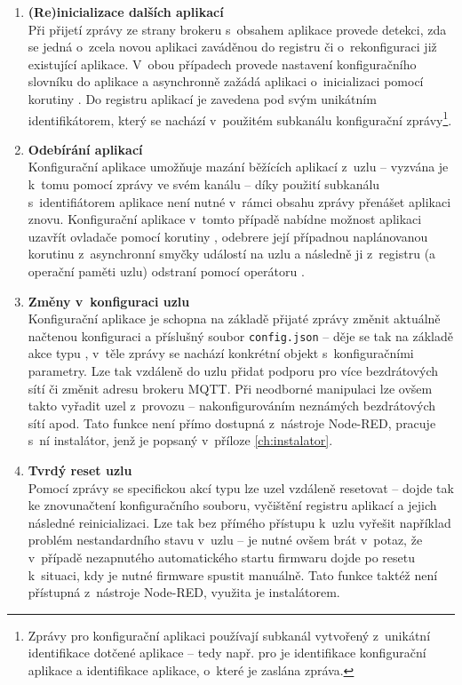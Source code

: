 \begin{enumerate}
    \item \textbf{(Re)inicializace dalších aplikací} \\
    Při přijetí zprávy ze strany brokeru s~obsahem 
    aplikace provede detekci, zda se jedná o~zcela novou aplikaci zaváděnou do registru či
    o~rekonfiguraci již existující aplikace. V~obou případech provede nastavení konfiguračního
    slovníku do aplikace a asynchronně zažádá aplikaci o~inicializaci pomocí korutiny .
    Do registru aplikací je zavedena pod svým unikátním identifikátorem, který se nachází v~použitém
    subkanálu konfigurační zprávy\footnote{Zprávy pro konfigurační aplikaci používají subkanál vytvořený
    z~unikátní identifikace dotčené aplikace -- tedy např. pro 
    je  identifikace konfigurační aplikace a  identifikace aplikace,
    o~které je zaslána zpráva.}.
    \item \textbf{Odebírání aplikací} \\
    Konfigurační aplikace umožňuje mazání běžících aplikací z~uzlu -- vyzvána je k~tomu pomocí zprávy
     ve svém kanálu -- díky použití subkanálu s~identifiátorem aplikace
    není nutné v~rámci obsahu zprávy přenášet aplikaci znovu. Konfigurační aplikace v~tomto případě
    nabídne možnost aplikaci uzavřít ovladače pomocí korutiny , odebrere její případnou
    naplánovanou korutinu z~asynchronní smyčky událostí na uzlu a následně ji z~registru (a operační paměti uzlu)
    odstraní pomocí operátoru .
    \item \textbf{Změny v~konfiguraci uzlu} \\
    Konfigurační aplikace je schopna na základě přijaté zprávy změnit aktuálně načtenou konfiguraci a příslušný
    soubor \texttt{config.json} -- děje se tak na základě akce typu , v~těle zprávy se nachází
    konkrétní objekt s~konfiguračními parametry. Lze tak vzdáleně do uzlu přidat podporu pro více bezdrátových sítí či
    změnit adresu brokeru MQTT. Při neodborné manipulaci lze ovšem takto vyřadit uzel z~provozu -- nakonfigurováním
    neznámých bezdrátových sítí apod. Tato funkce není přímo dostupná z~nástroje Node-RED, pracuje s~ní instalátor,
    jenž je popsaný v~příloze \ref{ch:instalator}.

    \item \textbf{Tvrdý reset uzlu} \\
    Pomocí zprávy se specifickou akcí typu  lze uzel vzdáleně resetovat -- dojde tak ke
    znovunačtení konfiguračního souboru, vyčištění registru aplikací a jejich následné reinicializaci.
    Lze tak bez přímého přístupu k~uzlu vyřešit například problém nestandardního stavu v~uzlu -- je nutné ovšem brát
    v~potaz, že v~případě nezapnutého automatického startu firmwaru dojde po resetu k~situaci, kdy je nutné firmware
    spustit manuálně. Tato funkce taktéž není přístupná z~nástroje Node-RED, využita je instalátorem.
\end{enumerate}
